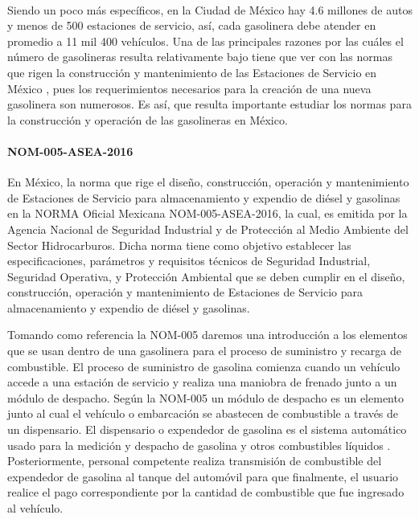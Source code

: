 \paragraph{}
Siendo un poco más específicos, en la Ciudad de México hay 4.6 millones de autos y menos de 500 estaciones de servicio, así, cada gasolinera debe atender en promedio a 11 mil 400 vehículos. Una de las principales razones por las cuáles el número de gasolineras resulta relativamente bajo tiene que ver con las normas que rigen la construcción y mantenimiento de las Estaciones de Servicio en México \citep{MarcoTeorico2}, pues los requerimientos necesarios para la creación de una nueva gasolinera son numerosos. Es así, que resulta importante estudiar los normas para la construcción y operación de las gasolineras en México.

\paragraph{NOM-005-ASEA-2016}
En México, la norma que rige el diseño, construcción, operación y mantenimiento de Estaciones de Servicio para almacenamiento y expendio de diésel y gasolinas en la NORMA Oficial Mexicana NOM-005-ASEA-2016, la cual, es emitida por la Agencia Nacional de Seguridad Industrial y de Protección al Medio Ambiente del Sector Hidrocarburos. Dicha norma tiene como objetivo establecer las especificaciones, parámetros y requisitos técnicos de Seguridad Industrial, Seguridad Operativa, y Protección Ambiental que se deben cumplir en el diseño, construcción, operación y mantenimiento de Estaciones de Servicio para almacenamiento y expendio de diésel y gasolinas.

Tomando como referencia la NOM-005 daremos una introducción a los elementos que se usan dentro de una gasolinera para el proceso de suministro y recarga de combustible.
El proceso de suministro de gasolina comienza cuando un vehículo accede a una estación de servicio y realiza una maniobra de frenado junto a un módulo de despacho. Según la NOM-005 un módulo de despacho es un elemento junto al cual el vehículo o embarcación se abastecen de combustible a través de un dispensario. El dispensario o expendedor de gasolina es el sistema automático usado para la medición y despacho de gasolina y otros combustibles líquidos \citep{NORMA-005}.
Posteriormente, personal competente realiza transmisión de combustible del expendedor de gasolina al tanque del automóvil para que finalmente, el usuario realice el pago correspondiente por la cantidad de combustible que fue ingresado al vehículo.

